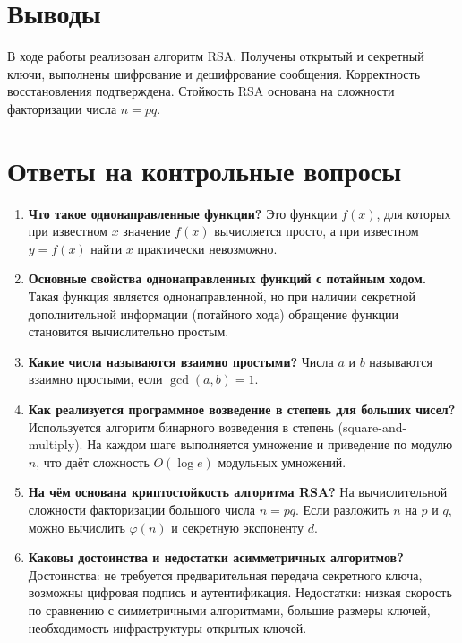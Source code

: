 \documentclass[12pt]{article}
\begin{document}
\section{Выводы}
В ходе работы реализован алгоритм RSA. Получены открытый и секретный ключи, выполнены шифрование и дешифрование сообщения. Корректность восстановления подтверждена. Стойкость RSA основана на сложности факторизации числа \(n=pq\).

\section{Ответы на контрольные вопросы}

\begin{enumerate}
    \item \textbf{Что такое однонаправленные функции?}  
    Это функции \(f(x)\), для которых при известном \(x\) значение \(f(x)\) вычисляется просто, а при известном \(y=f(x)\) найти \(x\) практически невозможно.

    \item \textbf{Основные свойства однонаправленных функций с потайным ходом.}  
    Такая функция является однонаправленной, но при наличии секретной дополнительной информации (потайного хода) обращение функции становится вычислительно простым.

    \item \textbf{Какие числа называются взаимно простыми?}  
    Числа \(a\) и \(b\) называются взаимно простыми, если \(\gcd(a,b)=1\).

    \item \textbf{Как реализуется программное возведение в степень для больших чисел?}  
    Используется алгоритм бинарного возведения в степень (square-and-multiply). На каждом шаге выполняется умножение и приведение по модулю \(n\), что даёт сложность \(O(\log e)\) модульных умножений.

    \item \textbf{На чём основана криптостойкость алгоритма RSA?}  
    На вычислительной сложности факторизации большого числа \(n=pq\). Если разложить \(n\) на \(p\) и \(q\), можно вычислить \(\varphi(n)\) и секретную экспоненту \(d\).

    \item \textbf{Каковы достоинства и недостатки асимметричных алгоритмов?}  
    Достоинства: не требуется предварительная передача секретного ключа, возможны цифровая подпись и аутентификация.  
    Недостатки: низкая скорость по сравнению с симметричными алгоритмами, большие размеры ключей, необходимость инфраструктуры открытых ключей.


\end{enumerate}
\end{document}
